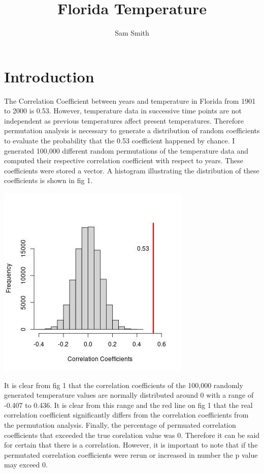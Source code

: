 \documentclass{article}
\title{Florida Temperature}
\author{Sam Smith}
\begin{document}
\maketitle

\section{Introduction}

The Correlation Coefficient between years and temperature in Florida from 1901 to 2000 is 0.53.
However, temperature data in successive time points are not independent as previous temperatures affect present temperatures. Therefore permutation analysis is necessary to generate a distribution of random coefficients to evaluate the probability that the 0.53 coefficient happened by chance. I generated 100,000 different random permutations of the temperature data and computed their respective correlation coefficient with respect to years. These coefficients were stored a vector. A histogram illustrating the distribution of these coefficients is shown in fig 1.

\begin{center}
\includegraphics[scale=0.47]{rplot.jpg}\\  
\end{center}

It is clear from fig 1 that the correlation coefficients of the 100,000 randomly generated temperature values are normally distributed around 0 with a range of -0.407 to 0.436. It is clear from this range and the red line on fig 1 that the real correlation coefficient significantly differs from the correlation coefficients from the permutation analysis. Finally, the percentage of permuated correlation coefficients that exceeded the true corelation value was 0. Therefore it can be said for certain that there is a correlation. However, it is important to note that if the permutated correlation coefficients were rerun or increased in number the p value may exceed 0.
\end{document}
